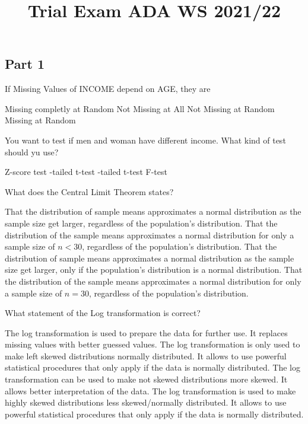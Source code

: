 \documentclass[addpoints]{exam}
\title{\textbf{Trial Exam ADA WS 2021/22}}
\author{}
\date{}
\begin{document}
	\maketitle
	
	\begin{questions}
		\section*{Part 1}
		\question[1] If Missing Values of INCOME depend on AGE, they are
		\begin{checkboxes}
			\choice Missing completly at Random
			\choice Not Missing at All
			\CorrectChoice Not Missing at Random
			\choice Missing at Random
		\end{checkboxes}
	
		\question[1] You want to test if men and woman have different income. What kind of test should yu use?
		\begin{checkboxes}
			\choice Z-score test
			-tailed t-test
			-tailed t-test
			\choice F-test
		\end{checkboxes}
	
		\question[1] What does the Central Limit Theorem states?
		\begin{checkboxes}
			\CorrectChoice That the distribution of sample means approximates a normal distribution as the sample size get larger, regardless of the population's distribution.
			\choice That the distribution of the sample means approximates a normal distribution for only a sample size of $n<30$, regardless of the population's distribution.
			\choice That the distribution of sample means approximates a normal distribution as the sample size get larger, only if the population's distribution is a normal distribution.
			\choice That the distribution of the sample means approximates a normal distribution for only a sample size of $n=30$, regardless of the population's distribution.
		\end{checkboxes}
	
		\question[1] What statement of the Log transformation is correct?
		\begin{checkboxes}
			\choice The log transformation is used to prepare the data for further use. It replaces missing values with better guessed values.
			\choice The log transformation is only used to make left skewed distributions normally distributed. It allows to use powerful statistical procedures that only apply if the data is normally distributed.
			\choice The log transformation can be used to make not skewed distributions more skewed. It allows better interpretation of the data.
			\CorrectChoice The log transformation is used to make highly skewed distributions less skewed/normally distributed. It allows to use powerful statistical procedures that only apply if the data is normally distributed.
		\end{checkboxes}
	

\end{questions}
\end{document}
